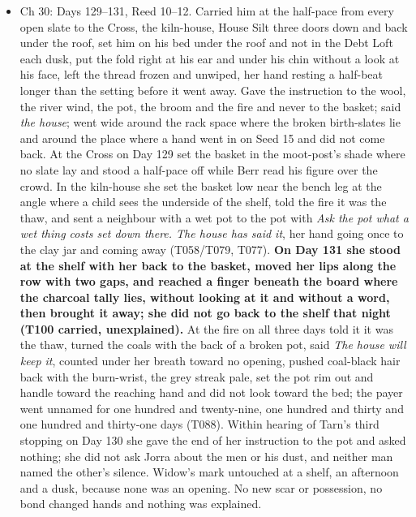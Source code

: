 \documentclass{design/chronicle}
\begin{document}
{\begin{itemize}[leftmargin=1.4em,itemsep=1pt,topsep=3pt,parsep=0pt]
\end{itemize}

\begin{itemize}[leftmargin=1.4em,itemsep=1pt,topsep=3pt,parsep=0pt]

\item Ch 30: Days 129–131, Reed 10–12. Carried him at the half-pace from every open slate to the Cross, the kiln-house, House Silt three doors down and back under the roof, set him on his bed under the roof and not in the Debt Loft each dusk, put the fold right at his ear and under his chin without a look at his face, left the thread frozen and unwiped, her hand resting a half-beat longer than the setting before it went away. Gave the instruction to the wool, the river wind, the pot, the broom and the fire and never to the basket; said \emph{the house}; went wide around the rack space where the broken birth-slates lie and around the place where a hand went in on Seed 15 and did not come back. At the Cross on Day 129 set the basket in the moot-post’s shade where no slate lay and stood a half-pace off while Berr read his figure over the crowd. In the kiln-house she set the basket low near the bench leg at the angle where a child sees the underside of the shelf, told the fire it was the thaw, and sent a neighbour with a wet pot to the pot with \emph{Ask the pot what a wet thing costs set down there. The house has said it}, her hand going once to the clay jar and coming away (T058/T079, T077). \textbf{On Day 131 she stood at the shelf with her back to the basket, moved her lips along the row with two gaps, and reached a finger beneath the board where the charcoal tally lies, without looking at it and without a word, then brought it away; she did not go back to the shelf that night (T100 carried, unexplained).} At the fire on all three days told it it was the thaw, turned the coals with the back of a broken pot, said \emph{The house will keep it}, counted under her breath toward no opening, pushed coal-black hair back with the burn-wrist, the grey streak pale, set the pot rim out and handle toward the reaching hand and did not look toward the bed; the payer went unnamed for one hundred and twenty-nine, one hundred and thirty and one hundred and thirty-one days (T088). Within hearing of Tarn’s third stopping on Day 130 she gave the end of her instruction to the pot and asked nothing; she did not ask Jorra about the men or his dust, and neither man named the other’s silence. Widow’s mark untouched at a shelf, an afternoon and a dusk, because none was an opening. No new scar or possession, no bond changed hands and nothing was explained.


\end{itemize}}
\end{document}
